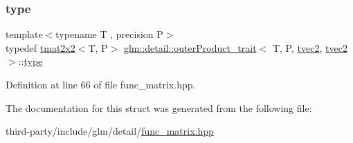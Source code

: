 \subsubsection{\texorpdfstring{type}{type}}
{\footnotesize\ttfamily template$<$typename T , precision P$>$ \\
typedef \hyperlink{structglm_1_1detail_1_1tmat2x2}{tmat2x2}$<$T, P$>$ \hyperlink{structglm_1_1detail_1_1outer_product__trait}{glm\+::detail\+::outer\+Product\+\_\+trait}$<$ T, P, \hyperlink{structglm_1_1detail_1_1tvec2}{tvec2}, \hyperlink{structglm_1_1detail_1_1tvec2}{tvec2} $>$\+::\hyperlink{structglm_1_1detail_1_1outer_product__trait_3_01_t_00_01_p_00_01tvec2_00_01tvec2_01_4_a390fb582fa7caa73e53f69181b3b334e}{type}}



Definition at line 66 of file func\+\_\+matrix.\+hpp.



The documentation for this struct was generated from the following file\+:\begin{DoxyCompactItemize}
\item 
third-\/party/include/glm/detail/\hyperlink{func__matrix_8hpp}{func\+\_\+matrix.\+hpp}\end{DoxyCompactItemize}

